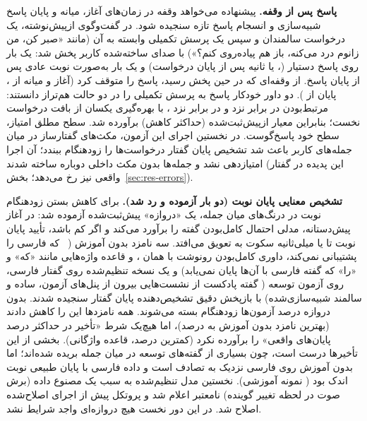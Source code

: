 \textbf{پاسخ پس از وقفه.} پیشنهاده می‌خواهد وقفه در زمان‌های آغاز، میانه و پایان
پاسخ شبیه‌سازی و انسجام پاسخ تازه سنجیده شود. در  گفت‌وگوی ازپیش‌نوشته، یک
درخواست سالمندان و سپس یک پرسش تکمیلی وابسته به آن (مانند «صبر کن، من زانوم درد
می‌کنه، باز هم پیاده‌روی کنم؟») با صدای ساخته‌شده کاربر پخش شد: یک بار روی پاسخ
دستیار (،  یا  ثانیه پس از پایان درخواست) و یک بار به‌صورت
نوبت عادی پس از پایان پاسخ. از  وقفه‌ای که در حین پخش رسید،  پاسخ
را متوقف کرد (آغاز و میانه  از ، پایان  از ). دو داور
خودکار پاسخ به پرسش تکمیلی را در دو حالت هم‌تراز دانستند: مرتبط‌بودن  در
برابر  نزد  و  در برابر  نزد ، با
بهره‌گیری یکسان از بافت درخواست نخست؛ بنابراین معیار ازپیش‌ثبت‌شده (حداکثر
 کاهش) برآورده شد. سطح مطلق امتیاز، سطح خود پاسخ‌گوست. در نخستین اجرای
این آزمون، مکث‌های گفتارساز در میان جمله‌های کاربر باعث شد تشخیص پایان گفتار
درخواست‌ها را زودهنگام ببندد؛ آن اجرا امتیازدهی نشد و جمله‌ها بدون مکث داخلی
دوباره ساخته شدند (این پدیده در گفتار واقعی نیز رخ می‌دهد؛ بخش~\ref{sec:res-errors}).

\textbf{تشخیص معنایی پایان نوبت (دو بار آزموده و رد شد).} برای کاهش بستن زودهنگام نوبت
در درنگ‌های میان جمله، یک «دروازه» پیش‌ثبت‌شده آزموده شد: در آغاز پیش‌دستانه،
مدلی احتمال کامل‌بودن گفته را برآورد می‌کند و اگر کم باشد، تأیید پایان نوبت تا
 یا  میلی‌ثانیه سکوت به تعویق می‌افتد. سه نامزد بدون آموزش
(~\cite{smartturn2025} که فارسی را پشتیبانی نمی‌کند، داوری
کامل‌بودن رونوشت با همان ، و قاعده واژه‌هایی مانند «که» و «را» که
گفته فارسی با آن‌ها پایان نمی‌یابد) و یک نسخه  تنظیم‌شده روی گفتار
فارسی، روی  آزمون توسعه ( گفته پادکست از نشست‌هایی بیرون از
پنل‌های آزمون، ساده و سالمند شبیه‌سازی‌شده) با بازپخش دقیق تشخیص‌دهنده پایان گفتار
سنجیده شدند. بدون دروازه  درصد آزمون‌ها زودهنگام بسته می‌شوند. همه
نامزدها این را کاهش دادند (بهترین نامزد بدون آموزش به  درصد)، اما هیچ‌یک
شرط «تأخیر در حداکثر  درصد پایان‌های واقعی» را برآورده نکرد (کمترین
 درصد، قاعده واژگانی). بخشی از این تأخیرها درست است، چون بسیاری از
گفته‌های توسعه در میان جمله بریده شده‌اند؛ اما  بدون آموزش روی
فارسی نزدیک به تصادف است و داده فارسی با پایان طبیعی نوبت اندک بود (
نمونه آموزشی). نخستین مدل تنظیم‌شده به سبب یک مصنوع داده (برش صوت در لحظه
تغییر گوینده) نامعتبر اعلام شد و پروتکل پیش از اجرای اصلاح‌شده اصلاح شد.
در این دور نخست هیچ دروازه‌ای واجد شرایط نشد.

